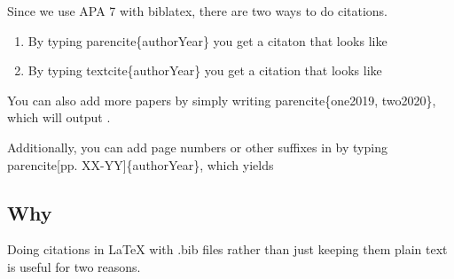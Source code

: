 \documentclass[twocolumn, serif]{jote-article}
\begin{document}


Since we use APA 7 with biblatex, there are two ways to do citations. 

\begin{enumerate}
    \item By typing parencite\{authorYear\} you get a citaton that looks like \parencite{Leboeuf2020b}
    \item By typing textcite\{authorYear\} you get a citation that looks like \textcite{DeGroot2020a}
\end{enumerate}

You can also add more papers by simply writing parencite\{one2019, two2020\}, which will output \parencite{Leboeuf2020b, DeGroot2020a}.

Additionally, you can add page numbers or other suffixes in by typing parencite[pp. XX-YY]\{authorYear\}, which yields \parencite[pp. XX-YY]{Leboeuf2020b}

\subsection*{Why}
Doing citations in LaTeX with .bib files rather than just keeping them plain text is useful for two reasons. 
\end{document}
